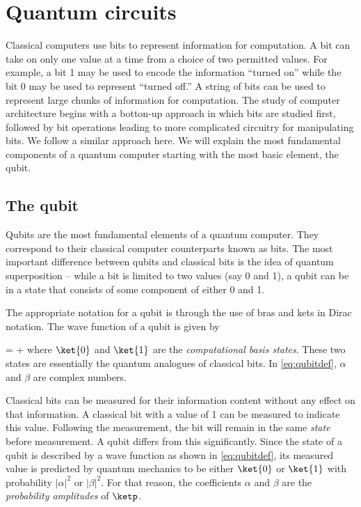 \chapter{Quantum circuits\label{ch:qcirc}}

Classical computers use bits to represent information for computation. A bit can take on only one value at a time from a choice of two permitted values. For example, a bit 1 may be used to encode the information ``turned on'' while the bit 0 may be used to represent ``turned off.'' A string of bits can be used to represent large chunks of information for computation. The study of computer architecture begins with a botton-up approach in which bits are studied first, followed by bit operations leading to more complicated circuitry for manipulating bits. We follow a similar approach here. We will explain the most fundamental components of a quantum computer starting with the most basic element, the qubit.

\section{The qubit}
Qubits are the most fundamental elements of a quantum computer. They correspond to their classical computer counterparts known as bits. The most important difference between qubits and classical bits is the idea of quantum superposition -- while a bit is limited to two values (say 0 and 1), a qubit can be in a state that consists of some component of either 0 and 1. 

The appropriate notation for a qubit is through the use of bras and kets in Dirac notation. The wave function of a qubit is given by

\beq
\label{eq:qubitdef}
\ketp = \alpha{} + \beta{}
\eeq
where $\ket{0}$ and $\ket{1}$ are the \textit{computational basis states}. These two states are essentially the quantum analogues of classical bits. In \eqref{eq:qubitdef}, $\alpha$ and $\beta$ are complex numbers. 

Classical bits can be measured for their information content without any effect on that information. A classical bit with a value of 1 can be measured to indicate this value. Following the measurement, the bit will remain in the same \textit{state} before measurement. A qubit differs from this significantly. Since the state of a qubit is described by a wave function as shown in \eqref{eq:qubitdef}, its measured value is predicted by quantum mechanics to be either $\ket{0}$ or $\ket{1}$ with probability $|\alpha|^2$ or $|\beta|^2$. For that reason, the coefficients $\alpha$ and $\beta$ are the \textit{probability amplitudes} of $\ketp$.

